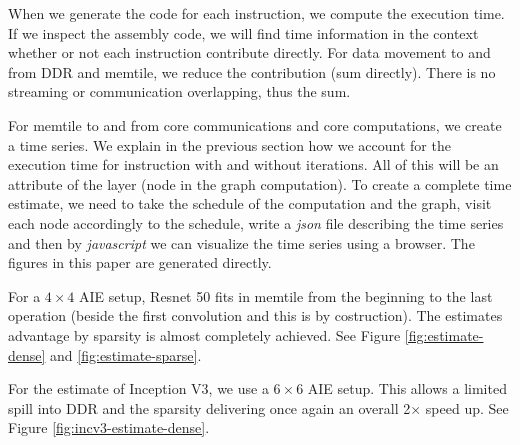 \documentclass[conference]{IEEEtran}
\begin{document}
When we generate the code for each instruction, we compute the
execution time. If we inspect the assembly code, we will find time
information in the context whether or not each instruction contribute
directly. For data movement to and from DDR and memtile, we reduce the
contribution (sum directly). There is no streaming or communication
overlapping, thus the sum.

For memtile to and from core communications and core computations, we
create a time series. We explain in the previous section how we
account for the execution time for instruction with and without
iterations. All of this will be an attribute of the layer (node in the
graph computation).  To create a complete time estimate, we need to
take the schedule of the computation and the graph, visit each node
accordingly to the schedule, write a {\em json} file describing the
time series and then by {\em javascript} we can visualize the time
series using a browser. The figures in this paper are generated
directly.

For a $4\times 4$ AIE setup, Resnet 50 fits in memtile from the
beginning to the last operation (beside the first convolution and this
is by costruction). The estimates advantage by sparsity is almost
completely achieved.  See Figure \ref{fig:estimate-dense} and
\ref{fig:estimate-sparse}.

For the estimate of Inception V3, we use a $6\times 6$ AIE setup.
This allows a limited spill into DDR and the sparsity delivering once
again an overall 2$\times$ speed up. See Figure
\ref{fig:incv3-estimate-dense}.
\end{document}
